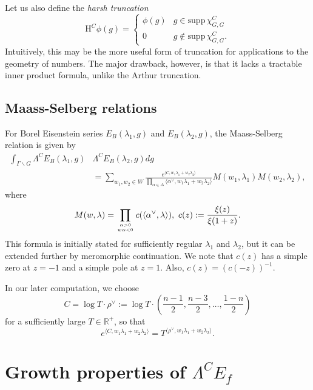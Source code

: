 \documentclass[11pt]{amsart}
\def\R{\mathbb{R}}
\numberwithin{theorem}{section}
\numberwithin{equation}{section}
\theoremstyle{remark}
\theoremstyle{definition}
\begin{document}
Let us also define the \emph{harsh truncation}
\begin{equation*}
\mathrm H^C\phi(g) = \begin{cases} \phi(g) & g \in \mathrm{supp}\,\chi^C_{G,G} \\ 0 & g \not\in \mathrm{supp}\,\chi^C_{G,G}. \end{cases}
\end{equation*}
Intuitively, this may be the more useful form of truncation for applications to the geometry of numbers. The major drawback, however, is that it lacks a tractable inner product formula, unlike the Arthur truncation.


\subsection{Maass-Selberg relations} \label{sec:maass}

For Borel Eisenstein series $E_B(\lambda_1,g)$ and $E_B(\lambda_2,g)$, the Maass-Selberg relation is given by
\begin{align*}
\int_{\Gamma \backslash G} \Lambda^CE_B(\lambda_1,g) &\Lambda^CE_B(\lambda_2,g) dg \\
&= \sum_{w_1,w_2 \in W} \frac{e^{\langle C, w_1\lambda_1+w_2\lambda_2\rangle}}{\prod_{\alpha \in \Delta}\langle \alpha^\vee, w_1\lambda_1+w_2\lambda_2\rangle}M(w_1,\lambda_1)M(w_2,\lambda_2),
\end{align*}
where
\begin{equation*}
M(w,\lambda) = \prod_{\alpha > 0 \atop w\alpha < 0} c(\langle \alpha^\vee, \lambda \rangle),\ c(z) := \frac{\xi(z)}{\xi(1+z)}.
\end{equation*}
This formula is initially stated for sufficiently regular $\lambda_1$ and $\lambda_2$, but it can be extended further by meromorphic continuation.
We note that $c(z)$ has a simple zero at $z = -1$ and a simple pole at $z = 1$. Also, $c(z) = (c(-z))^{-1}$.

In our later computation, we choose 
\begin{equation*}
C = \log T \cdot \rho^\vee := \log T \cdot \left(\frac{n-1}{2},\frac{n-3}{2},\ldots,\frac{1-n}{2}\right)
\end{equation*}
for a sufficiently large $T \in \R^+$, so that
\begin{equation*}
e^{\langle C, w_1\lambda_1+w_2\lambda_2\rangle} = T^{\langle \rho^\vee, w_1\lambda_1+w_2\lambda_2\rangle}.
\end{equation*}


\section{Growth properties of $\Lambda^CE_f$}
\end{document}
